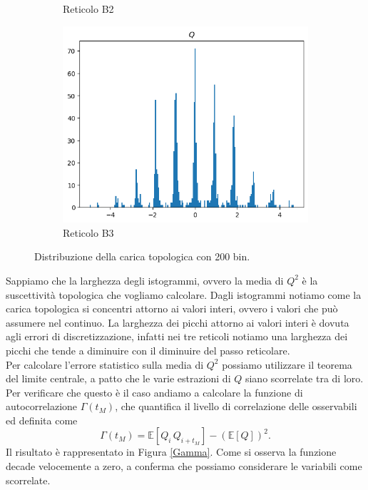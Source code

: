 \documentclass{article}
\numberwithin{equation}{subsection}
\begin{document}
\begin{figure}[H]
\begin{subfigure}{0.41\linewidth}
    \caption{Reticolo B2}
  \end{subfigure}
  \hfill
  \begin{subfigure}{0.41\linewidth}
    \centering
    \includegraphics[width=\linewidth]{images/istoB2.png}
    \caption{Reticolo B3}
  \end{subfigure}
  \caption{Distribuzione della carica topologica con 200 bin.}
  \label{isotrgrammi}
\end{figure}

Sappiamo che la larghezza degli istogrammi, ovvero la media di $Q^2$ è la suscettività topologica che vogliamo calcolare. Dagli istogrammi notiamo come la carica topologica si concentri attorno ai valori interi, ovvero i valori che può assumere nel continuo. La larghezza dei picchi attorno ai valori interi è dovuta agli errori di discretizzazione, infatti nei tre reticoli notiamo una larghezza dei picchi che tende a diminuire con il diminuire del passo reticolare. \\ 
Per calcolare l'errore statistico sulla media di $Q^2$ possiamo utilizzare il teorema del limite centrale, a patto che le varie estrazioni di $Q$ siano scorrelate tra di loro. Per verificare che questo è il caso andiamo a calcolare la funzione di autocorrelazione $\Gamma(t_M)$, che quantifica il livello di correlazione delle osservabili ed definita come 
\begin{equation}
    \Gamma(t_M)=\mathbb{E}[Q_i\,Q_{i+t_M}]-\left(\mathbb{E}[Q]\right)^2.
\end{equation}
Il risultato è rappresentato in Figura \ref{Gamma}. Come si osserva la funzione decade velocemente a zero, a conferma che possiamo considerare le variabili come scorrelate.
\end{document}

